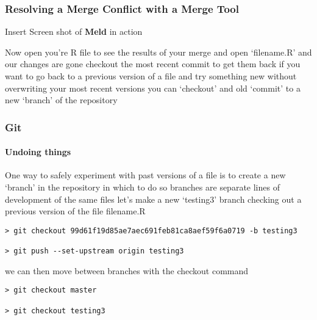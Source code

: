 \documentclass[xcolor=dvipsnames]{beamer}
\begin{document}
\begin{frame}[fragile]
\frametitle{Resolving a Merge Conflict with a Merge Tool}

Insert Screen shot of \textbf{Meld} in action

\end{frame}

\begin{frame}

Now open you're R file to see the results of your merge
\newline
\newline
and open `filename.R' and our changes are gone
\newline
\newline
checkout the most recent commit to get them back
\newline
\newline
if you want to go back to a previous version of a file and try something new without overwriting your most recent versions you can `checkout' and old `commit' to a new `branch' of the repository

\end{frame}



\begin{frame}[fragile]
\frametitle{Git}
\framesubtitle{Undoing things}
One way to safely experiment with past versions of a file is to create a new `branch' in the repository in which to do so
\newline
\newline
branches are separate lines of development of the same files
\newline
\newline
let's make a new `testing3' branch checking out a previous version of the file filename.R\\
\begin{lstlisting}
> git checkout 99d61f19d85ae7aec691feb81ca8aef59f6a0719 -b testing3

> git push --set-upstream origin testing3
\end{lstlisting}
we can then move between branches with the checkout command
\begin{lstlisting}
> git checkout master

> git checkout testing3
\end{lstlisting}
\end{frame}
\end{document}
